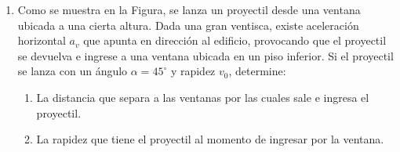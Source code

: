 \documentclass[letterpaper,11pt]{article}
\begin{document}
\begin{enumerate}
\item 
\begin{multicols}{2}
Como se muestra en la Figura, se lanza un proyectil desde una ventana ubicada a una cierta altura. Dada una gran ventisca, existe aceleración horizontal $a_v$ que apunta en dirección al edificio, provocando que el proyectil se devuelva e ingrese a una ventana ubicada en un piso inferior. Si el proyectil se lanza con un ángulo $\alpha=45^{\circ}$ y rapidez $v_0$, determine:

\begin{enumerate}
    \item La distancia que separa a las ventanas por las cuales sale e ingresa el proyectil.
    
    \item La rapidez que tiene el proyectil al momento de ingresar por la ventana.
\end{enumerate}

\columnbreak

\begin{figure}[H]
    \centering
    
\end{figure}

\end{multicols}





%   

\end{enumerate}
\end{document}
